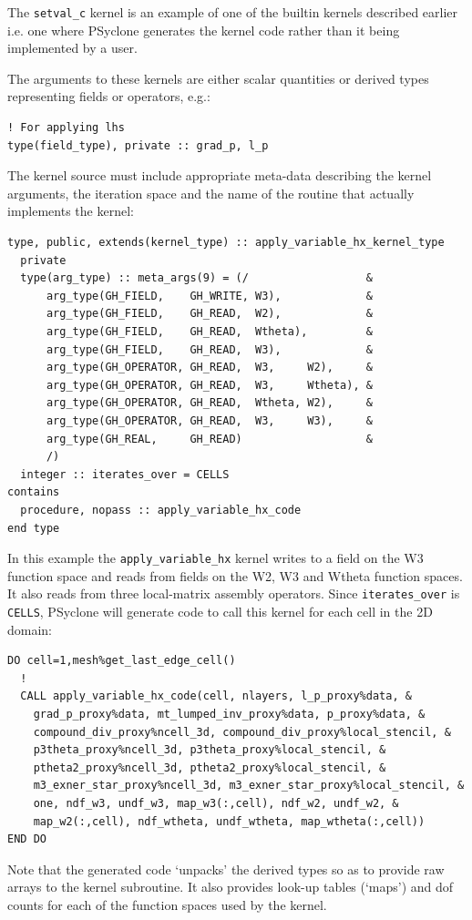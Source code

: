 \documentclass[times]{elsarticle}
\begin{document}
The \texttt{setval\_c} kernel is an example of one of the builtin
kernels described earlier i.e. one where PSyclone generates the kernel
code rather than it being implemented by a user.

The arguments to these kernels are either scalar quantities or
derived types representing fields or operators, e.g.:

\begin{lstlisting}
! For applying lhs
type(field_type), private :: grad_p, l_p
\end{lstlisting}

The kernel source must include appropriate meta-data describing the
kernel arguments, the iteration space and the name of the routine
that actually implements the kernel:
\begin{lstlisting}
type, public, extends(kernel_type) :: apply_variable_hx_kernel_type
  private
  type(arg_type) :: meta_args(9) = (/                  &
      arg_type(GH_FIELD,    GH_WRITE, W3),             &
      arg_type(GH_FIELD,    GH_READ,  W2),             &
      arg_type(GH_FIELD,    GH_READ,  Wtheta),         &
      arg_type(GH_FIELD,    GH_READ,  W3),             &
      arg_type(GH_OPERATOR, GH_READ,  W3,     W2),     &
      arg_type(GH_OPERATOR, GH_READ,  W3,     Wtheta), &
      arg_type(GH_OPERATOR, GH_READ,  Wtheta, W2),     &
      arg_type(GH_OPERATOR, GH_READ,  W3,     W3),     &
      arg_type(GH_REAL,     GH_READ)                   &
      /)
  integer :: iterates_over = CELLS
contains
  procedure, nopass :: apply_variable_hx_code
end type
\end{lstlisting}
In this example the \texttt{apply\_variable\_hx} kernel writes to a field on the
W3 function space and reads from fields on the W2, W3 and Wtheta
function spaces. It also reads from three local-matrix assembly operators.
Since \texttt{iterates\_over} is \texttt{CELLS}, PSyclone will generate code
to call this kernel for each cell in the 2D domain:
\begin{lstlisting}
DO cell=1,mesh%get_last_edge_cell()
  !
  CALL apply_variable_hx_code(cell, nlayers, l_p_proxy%data, &
    grad_p_proxy%data, mt_lumped_inv_proxy%data, p_proxy%data, &
    compound_div_proxy%ncell_3d, compound_div_proxy%local_stencil, &
    p3theta_proxy%ncell_3d, p3theta_proxy%local_stencil, &
    ptheta2_proxy%ncell_3d, ptheta2_proxy%local_stencil, &
    m3_exner_star_proxy%ncell_3d, m3_exner_star_proxy%local_stencil, &
    one, ndf_w3, undf_w3, map_w3(:,cell), ndf_w2, undf_w2, &
    map_w2(:,cell), ndf_wtheta, undf_wtheta, map_wtheta(:,cell))
END DO 
\end{lstlisting}
Note that the generated code `unpacks' the derived types so as to
provide raw arrays to the kernel subroutine. It also provides look-up
tables (`maps') and dof counts for each of the function spaces used by
the kernel. 
\end{document}

